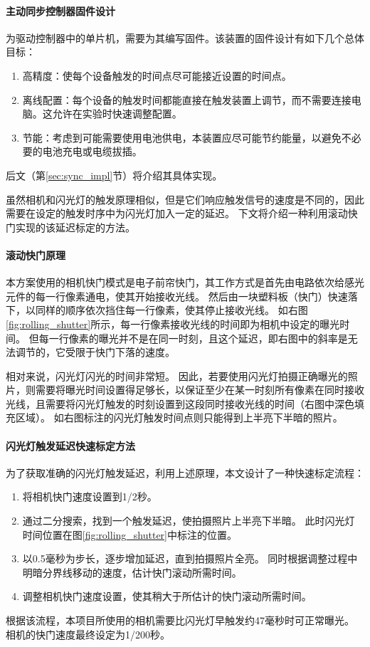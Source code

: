 \paragraph{主动同步控制器固件设计}
为驱动控制器中的单片机，需要为其编写固件。该装置的固件设计有如下几个总体目标：
\begin{enumerate}
\item 高精度：使每个设备触发的时间点尽可能接近设置的时间点。
\item 离线配置：每个设备的触发时间都能直接在触发装置上调节，而不需要连接电脑。这允许在实验时快速调整配置。
\item 节能：考虑到可能需要使用电池供电，本装置应尽可能节约能量，以避免不必要的电池充电或电缆拔插。
\end{enumerate}
后文（第\ref{sec:sync_impl}节）将介绍其具体实现。

虽然相机和闪光灯的触发原理相似，但是它们响应触发信号的速度是不同的，因此需要在设定的触发时序中为闪光灯加入一定的延迟。
下文将介绍一种利用滚动快门实现的该延迟标定的方法。


\paragraph{滚动快门原理}
本方案使用的相机快门模式是电子前帘快门，其工作方式是首先由电路依次给感光元件的每一行像素通电，使其开始接收光线。
然后由一块塑料板（快门）快速落下，以同样的顺序依次挡住每一行像素，使其停止接收光线。
如右图\ref{fig:rolling_shutter}所示，每一行像素接收光线的时间即为相机中设定的曝光时间。
但每一行像素的曝光并不是在同一时刻，且这个延迟，即右图中的斜率是无法调节的，它受限于快门下落的速度。

相对来说，闪光灯闪光的时间非常短。
因此，若要使用闪光灯拍摄正确曝光的照片，则需要将曝光时间设置得足够长，以保证至少在某一时刻所有像素在同时接收光线，且需要将闪光灯触发的时刻设置到这段同时接收光线的时间（右图中深色填充区域）。
如右图标注的闪光灯触发时间点则只能得到上半亮下半暗的照片。

\paragraph{闪光灯触发延迟快速标定方法}
为了获取准确的闪光灯触发延迟，利用上述原理，本文设计了一种快速标定流程：
\begin{enumerate}
\item 将相机快门速度设置到1/2秒。
\item 通过二分搜索，找到一个触发延迟，使拍摄照片上半亮下半暗。
此时闪光灯时间位置在图\ref{fig:rolling_shutter}中标注的位置。
\item 以0.5毫秒为步长，逐步增加延迟，直到拍摄照片全亮。
同时根据调整过程中明暗分界线移动的速度，估计快门滚动所需时间。
\item 调整相机快门速度设置，使其稍大于所估计的快门滚动所需时间。
\end{enumerate}
根据该流程，本项目所使用的相机需要比闪光灯早触发约47毫秒时可正常曝光。
相机的快门速度最终设定为1/200秒。

